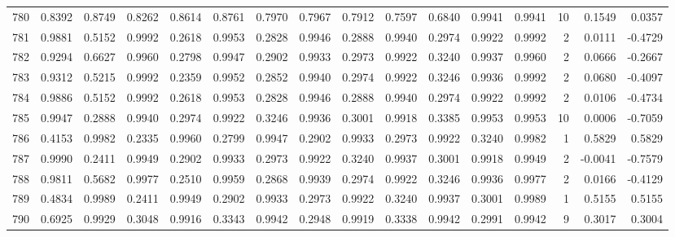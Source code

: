 \begin{tabular}{lrrrrrrrrrrrrrrr}
780 &      0.8392 &  0.8749 &  0.8262 &  0.8614 &  0.8761 &  0.7970 &  0.7967 &  0.7912 &  0.7597 &  0.6840 &   0.9941 &     0.9941 &     10 &                    0.1549 &                     0.0357 \\
781 &      0.9881 &  0.5152 &  0.9992 &  0.2618 &  0.9953 &  0.2828 &  0.9946 &  0.2888 &  0.9940 &  0.2974 &   0.9922 &     0.9992 &      2 &                    0.0111 &                    -0.4729 \\
782 &      0.9294 &  0.6627 &  0.9960 &  0.2798 &  0.9947 &  0.2902 &  0.9933 &  0.2973 &  0.9922 &  0.3240 &   0.9937 &     0.9960 &      2 &                    0.0666 &                    -0.2667 \\
783 &      0.9312 &  0.5215 &  0.9992 &  0.2359 &  0.9952 &  0.2852 &  0.9940 &  0.2974 &  0.9922 &  0.3246 &   0.9936 &     0.9992 &      2 &                    0.0680 &                    -0.4097 \\
784 &      0.9886 &  0.5152 &  0.9992 &  0.2618 &  0.9953 &  0.2828 &  0.9946 &  0.2888 &  0.9940 &  0.2974 &   0.9922 &     0.9992 &      2 &                    0.0106 &                    -0.4734 \\
785 &      0.9947 &  0.2888 &  0.9940 &  0.2974 &  0.9922 &  0.3246 &  0.9936 &  0.3001 &  0.9918 &  0.3385 &   0.9953 &     0.9953 &     10 &                    0.0006 &                    -0.7059 \\
786 &      0.4153 &  0.9982 &  0.2335 &  0.9960 &  0.2799 &  0.9947 &  0.2902 &  0.9933 &  0.2973 &  0.9922 &   0.3240 &     0.9982 &      1 &                    0.5829 &                     0.5829 \\
787 &      0.9990 &  0.2411 &  0.9949 &  0.2902 &  0.9933 &  0.2973 &  0.9922 &  0.3240 &  0.9937 &  0.3001 &   0.9918 &     0.9949 &      2 &                   -0.0041 &                    -0.7579 \\
788 &      0.9811 &  0.5682 &  0.9977 &  0.2510 &  0.9959 &  0.2868 &  0.9939 &  0.2974 &  0.9922 &  0.3246 &   0.9936 &     0.9977 &      2 &                    0.0166 &                    -0.4129 \\
789 &      0.4834 &  0.9989 &  0.2411 &  0.9949 &  0.2902 &  0.9933 &  0.2973 &  0.9922 &  0.3240 &  0.9937 &   0.3001 &     0.9989 &      1 &                    0.5155 &                     0.5155 \\
790 &      0.6925 &  0.9929 &  0.3048 &  0.9916 &  0.3343 &  0.9942 &  0.2948 &  0.9919 &  0.3338 &  0.9942 &   0.2991 &     0.9942 &      9 &                    0.3017 &                     0.3004 \\

\end{tabular}
